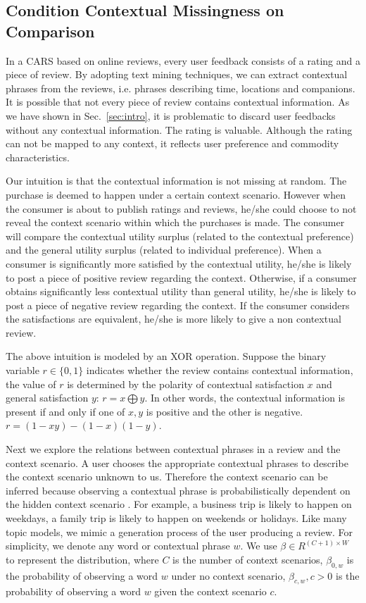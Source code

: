 \documentclass{llncs}
\begin{document}
\subsection{ Condition Contextual Missingness on Comparison}
In a CARS based on online reviews,  every user feedback consists of a rating and a piece of review. By adopting text mining techniques, we can extract contextual phrases from the reviews, i.e. phrases describing time, locations and companions. It is possible that not every piece of review contains contextual information. As we have shown in Sec.~\ref{sec:intro}, it is problematic to discard user feedbacks without any contextual information. The rating is valuable. Although the rating can not be mapped to any context, it reflects user preference and commodity characteristics.
 
Our intuition is that the contextual information is not missing at random. The purchase is deemed to happen under a certain context scenario. However when the consumer is about to publish ratings and reviews, he/she could choose to not reveal the context scenario within which the purchases is made. The consumer will compare the contextual utility surplus (related to the contextual preference) and the general utility surplus (related to individual preference).  When a consumer is significantly more satisfied by the contextual utility, he/she is likely to post a piece of positive review regarding the context. Otherwise, if a consumer obtains significantly less contextual utility than general utility, he/she is likely to post a piece of negative review regarding the context. If the consumer considers the satisfactions are equivalent, he/she is more likely to give a non contextual review. 

The above intuition is modeled by an XOR operation. Suppose the binary variable $r\in\{0,1\}$ indicates whether the review contains contextual information, the value of $r$ is determined by the polarity of contextual satisfaction $x$ and general satisfaction $y$: $r=x\bigoplus  y$. In other words, the contextual information is present if and only if one of $x,y$ is positive and the other is negative. $r=(1-xy)-(1-x)(1-y)$.

Next we explore the relations between contextual phrases in a review and the context scenario.  A user chooses the appropriate  contextual phrases  to describe the context scenario unknown to us. Therefore the context scenario can be inferred because observing  a contextual phrase is probabilistically dependent on the hidden context scenario . For example,  a business trip is likely to happen on weekdays, a family trip is likely to happen on weekends or holidays. Like many topic models, we mimic a generation process of the user producing a review. For simplicity, we denote any word or contextual phrase $w$. We use $\beta\in R^{(C+1)\times W}$ to represent the distribution, where $C$ is the number of context scenarios, $\beta_{0,w}$ is the probability of observing a word $w$ under no context scenario, $\beta_{c,w},c>0$ is the probability of observing a word $w$ given the context scenario $c$.
\end{document}
